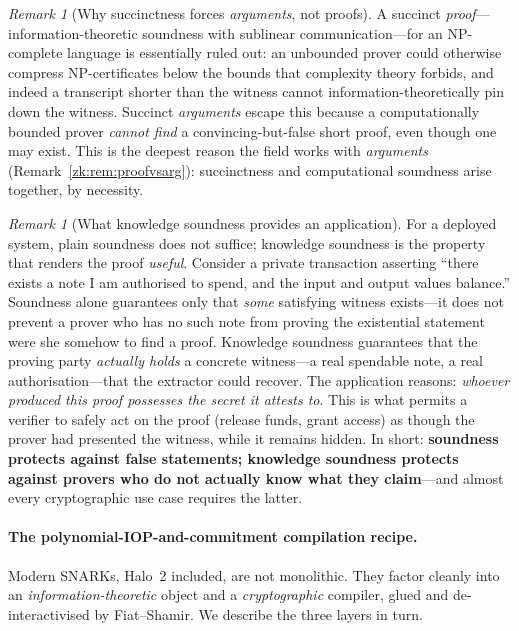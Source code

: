 \documentclass[11pt,a4paper]{article}
\theoremstyle{definition}
\theoremstyle{remark}
\newtheorem{remark}[theorem]{Remark}
\begin{document}
\begin{remark}[Why succinctness forces \emph{arguments}, not proofs]\label{zk:rem:succinctforcesarg}
A succinct \emph{proof}---information-theoretic soundness with sublinear communication---for an \textsf{NP}-complete language is essentially ruled out: an unbounded prover could otherwise compress \textsf{NP}-certificates below the bounds that complexity theory forbids, and indeed a transcript shorter than the witness cannot information-theoretically pin down the witness. Succinct \emph{arguments} escape this because a computationally bounded prover \emph{cannot find} a convincing-but-false short proof, even though one may exist. This is the deepest reason the field works with \emph{arguments} (Remark~\ref{zk:rem:proofvsarg}): succinctness and computational soundness arise together, by necessity.
\end{remark}

\begin{remark}[What knowledge soundness provides an application]\label{zk:rem:ksbuys}
For a deployed system, plain soundness does not suffice; knowledge soundness is the property that renders the proof \emph{useful}. Consider a private transaction asserting ``there exists a note I am authorised to spend, and the input and output values balance.'' Soundness alone guarantees only that \emph{some} satisfying witness exists---it does not prevent a prover who has no such note from proving the existential statement were she somehow to find a proof. Knowledge soundness guarantees that the proving party \emph{actually holds} a concrete witness---a real spendable note, a real authorisation---that the extractor could recover. The application reasons: \emph{whoever produced this proof possesses the secret it attests to}. This is what permits a verifier to safely act on the proof (release funds, grant access) as though the prover had presented the witness, while it remains hidden. In short: \textbf{soundness protects against false statements; knowledge soundness protects against provers who do not actually know what they claim}---and almost every cryptographic use case requires the latter.
\end{remark}

\paragraph{The polynomial-IOP-and-commitment compilation recipe.} Modern SNARKs, Halo~2 included, are not monolithic. They factor cleanly into an \emph{information-theoretic} object and a \emph{cryptographic} compiler, glued and de-interactivised by Fiat--Shamir. We describe the three layers in turn.
\end{document}
